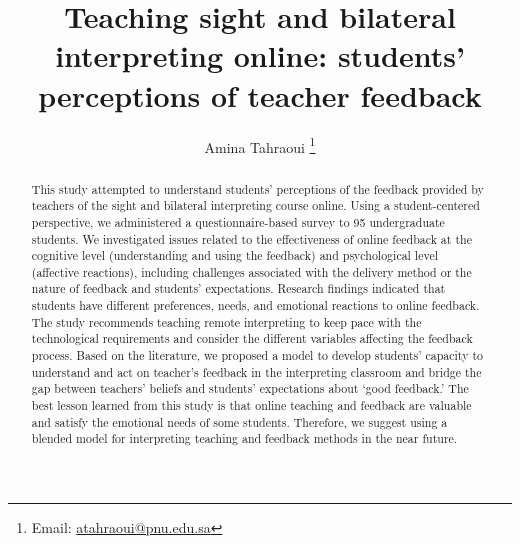 \documentclass[english]{textolivre}
\title{Teaching sight and bilateral interpreting online: students’ perceptions of teacher feedback}
\author[1]{Amina Tahraoui \orcid{0000-0002-4214-987X} \thanks{Email: \href{mailto:atahraoui@pnu.edu.sa}{atahraoui@pnu.edu.sa}}}
\affil[1]{Princess Nourah bint Abdulrahman University, College of Languages, Translation Department, Riyadh, Saudi Arabia.}
\begin{document}
\maketitle

\begin{polyabstract}
\begin{abstract}
This study attempted to understand students’ perceptions of the feedback provided by teachers of the sight and bilateral interpreting course online. Using a student-centered perspective, we administered a questionnaire-based survey to 95 undergraduate students. We investigated issues related to the effectiveness of online feedback at the cognitive level (understanding and using the feedback) and psychological level (affective reactions), including challenges associated with the delivery method or the nature of feedback and students’ expectations. Research findings indicated that students have different preferences, needs, and emotional reactions to online feedback. The study recommends teaching remote interpreting to keep pace with the technological requirements and consider the different variables affecting the feedback process. Based on the literature, we proposed a model to develop students’ capacity to understand and act on teacher’s feedback in the interpreting classroom and bridge the gap between teachers’ beliefs and students’ expectations about ‘good feedback.’ The best lesson learned from this study is that online teaching and feedback are valuable and satisfy the emotional needs of some students. Therefore, we suggest using a blended model for interpreting teaching and feedback methods in the near future.

\end{abstract}


\end{polyabstract}
\end{document}
